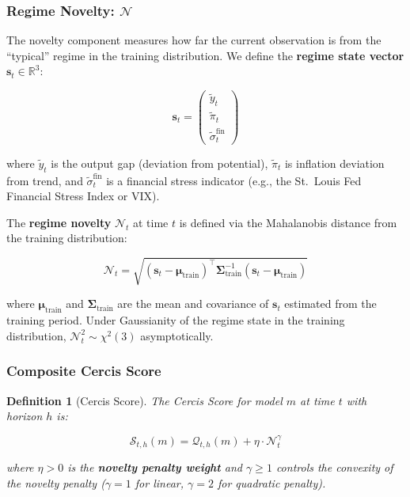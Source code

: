 \documentclass[12pt,a4paper]{article}
\newtheorem{definition}[theorem]{Definition}
\begin{document}
\subsubsection{Regime Novelty: $\mathcal{N}$}

The novelty component measures how far the current observation is
from the ``typical'' regime in the training distribution.  We define
the \textbf{regime state vector} $\mathbf{s}_t \in \mathbb{R}^3$:

\begin{equation}
    \mathbf{s}_t = \begin{pmatrix}
        \tilde{y}_t \\  %
        \tilde{\pi}_t \\  %
        \tilde{\sigma}_t^{\text{fin}}  %
    \end{pmatrix} \label{eq:regime_state}
\end{equation}

where $\tilde{y}_t$ is the output gap (deviation from potential),
$\tilde{\pi}_t$ is inflation deviation from trend, and
$\tilde{\sigma}_t^{\text{fin}}$ is a financial stress indicator
(e.g., the St.\ Louis Fed Financial Stress Index or VIX).

The \textbf{regime novelty} $\mathcal{N}_t$ at time $t$ is defined
via the Mahalanobis distance from the training distribution:

\begin{equation}
    \mathcal{N}_t = \sqrt{(\mathbf{s}_t - \boldsymbol{\mu}_{\text{train}})^\top
    \mathbf{\Sigma}_{\text{train}}^{-1} (\mathbf{s}_t -
    \boldsymbol{\mu}_{\text{train}})} \label{eq:novelty_mahalanobis}
\end{equation}

where $\boldsymbol{\mu}_{\text{train}}$ and $\mathbf{\Sigma}_{\text{train}}$
are the mean and covariance of $\mathbf{s}_t$ estimated from the
training period.  Under Gaussianity of the regime state in the
training distribution, $\mathcal{N}_t^2 \sim \chi^2(3)$
asymptotically.

\subsubsection{Composite Cercis Score}

\begin{definition}[Cercis Score]
\label{def:cercis}
The Cercis Score for model $m$ at time $t$ with horizon $h$ is:

\begin{equation}
    \boxed{
    \mathcal{S}_{t,h}(m) = \mathcal{Q}_{t,h}(m) + \eta \cdot
    \mathcal{N}_t^{\gamma}
    }
    \label{eq:cercis}
\end{equation}

where $\eta > 0$ is the \textbf{novelty penalty weight} and
$\gamma \geq 1$ controls the convexity of the novelty penalty
($\gamma = 1$ for linear, $\gamma = 2$ for quadratic penalty).
\end{definition}
\end{document}
